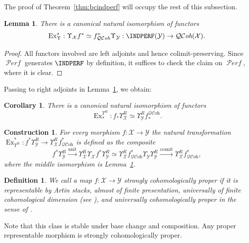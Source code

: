 \documentclass[12pt, oneside]{amsart}
\numberwithin{equation}{section}
\newtheorem{corollary}[subsubsection]{Corollary}
\newtheorem{definition}[subsubsection]{Definition}
\newtheorem{lemma}[subsubsection]{Lemma}
\newtheorem{construction}[subsubsection]{Construction}
\theoremstyle{remark}
\theoremstyle{plain}
\DeclareMathOperator{\QCOH}{\mathcal{QC}\textit{oh}}
\DeclareMathOperator{\PERF}{\mathcal{P}\textit{erf}}
\newcommand{\YY}{\mathcal{Y}}
\newcommand{\XX}{\mathcal{X}}
\newcommand{\Ren}{\Upsilon}
\begin{document}
The proof of Theorem~\ref{thm:bcindperf} will occupy the rest of this subsection.

\begin{lemma}\label{lefts} There is a canonical natural isomorphism of functors $$\operatorname{Ex}^*_{\Ren} : \Ren_\XX f^* \simeq f_{\QCOH}^*\Ren_\YY:\INDPERF(\YY)\rightarrow\QCOH(\XX).$$\end{lemma}

\begin{proof} All functors involved are left adjoints and hence colimit-preserving. Since $\PERF$ generates $\INDPERF$ by definition, it suffices to check the claim on $\PERF$, where it is clear.\end{proof}

Passing to right adjoints in Lemma~\ref{lefts}, we obtain:
\begin{corollary} \label{rights} There is a canonical natural isomorphism of functors $$\operatorname{Ex}_*^{\Ren^R} : f_*\Ren_\XX^R\simeq \Ren_\YY^R f^{\QCOH}_*.$$\end{corollary}

\begin{construction}\label{constr:Ex f^* PhiR}
For every morphism $f : \XX \to \YY$ the natural transformation
$\operatorname{Ex}^*_{\Ren^R} : f^*\Ren_\YY^R \to \Ren_\XX^R f^*_{\QCOH}$ is defined as the composite
\[
  f^*\Ren_\YY^R
  \xrightarrow{\mathrm{unit}} \Ren_\XX^R\Ren_\XX f^*\Ren_\YY^R
  \simeq \Ren_\XX^R f^*_{\QCOH}\Ren_\YY\Ren_\YY^R
  \xrightarrow{\mathrm{counit}} \Ren_\XX^R f^*_{\QCOH},
\]
where the middle isomorphism is Lemma~\ref{lefts}.
\end{construction}

\begin{definition}\label{def:str coh proper}
We call a map $f : \XX \to \YY$ \emph{strongly cohomologically proper} if it is representable by Artin stacks, almost of finite presentation, universally of finite cohomological dimension (see \cite[Def.~1.18]{KhanKstack}), and universally cohomologically proper in the sense of \cite[Def.~1.26]{KhanKstack}.
\end{definition}

Note that this class is stable under base change and composition. Any proper representable morphism is strongly cohomologically proper.
\end{document}
